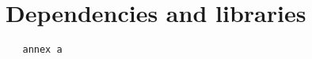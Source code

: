 \chapter{Dependencies and libraries}%
\label{app:annexA}

\begin{center}
    \begin{verbatim}
   annex a 
    \end{verbatim}
\end{center}